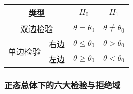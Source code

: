 \documentclass[UTF8, 12pt]{ctexart}
\begin{document}
\begin{tabular}{|c|c|c|c|}
    \hline
    \multicolumn{2}{|c|}{类型} & $H_0$ & $H_1$ \\ \hline
    \multicolumn{2}{|c|}{双边检验} & $\theta=\theta_0$ & $\theta\neq\theta_0$ \\ \hline
    \multirow{2}{*}{单边检验} & 右边 & $\theta\leqslant\theta_0$ & $\theta>\theta_0$ \\ \cline{2-4}
    & 左边 & $\theta\geqslant\theta_0$ & $\theta<\theta_0$ \\ \hline
\end{tabular}

\subsubsection{正态总体下的六大检验与拒绝域}
\end{document}
